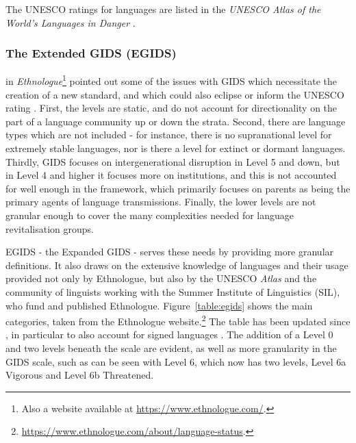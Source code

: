 The UNESCO ratings for languages are listed in the \textit{UNESCO Atlas of the World's Languages in Danger} \citep{unesco2014unesco}.

\subsubsection{The Extended GIDS (EGIDS)}

\citet{lewis2009ethnologue} in \textit{Ethnologue}\footnote{Also a website available at \href{https://www.ethnologue.com/}{https://www.ethnologue.com/}. } pointed out some of the issues with GIDS which necessitate the creation of a new standard, and which could also eclipse or inform the UNESCO rating \citep{lewis2010assessing}. First, the levels are static, and do not account for directionality on the part of a language community up or down the strata. Second, there are language types which are not included - for instance, there is no supranational level for extremely stable languages, nor is there a level for extinct or dormant languages. Thirdly, GIDS focuses on intergenerational disruption in Level 5 and down, but in Level 4 and higher it focuses more on institutions, and this is not accounted for well enough in the framework, which primarily focuses on parents as being the primary agents of language transmissions. Finally, the lower levels are not granular enough to cover the many complexities needed for language revitalisation groups.

EGIDS - the Expanded GIDS - serves these needs by providing more granular definitions. It also draws on the extensive knowledge of languages and their usage provided not only by Ethnologue, but also by the UNESCO \textit{Atlas} and the community of linguists working with the Summer Institute of Linguistics (SIL), who fund and published Ethnologue. Figure~\ref{table:egids} shows the main categories, taken from the Ethnologue website.\footnote{\href{https://www.ethnologue.com/about/language-status}{https://www.ethnologue.com/about/language-status}. } The table has been updated since \citet{lewis2010assessing}, in particular to also account for signed languages \citep{bickford2015rating}. The addition of a Level 0 and two levels beneath the scale are evident, as well as more granularity in the GIDS scale, such as can be seen with Level 6, which now has two levels, Level 6a Vigorous and Level 6b Threatened.

